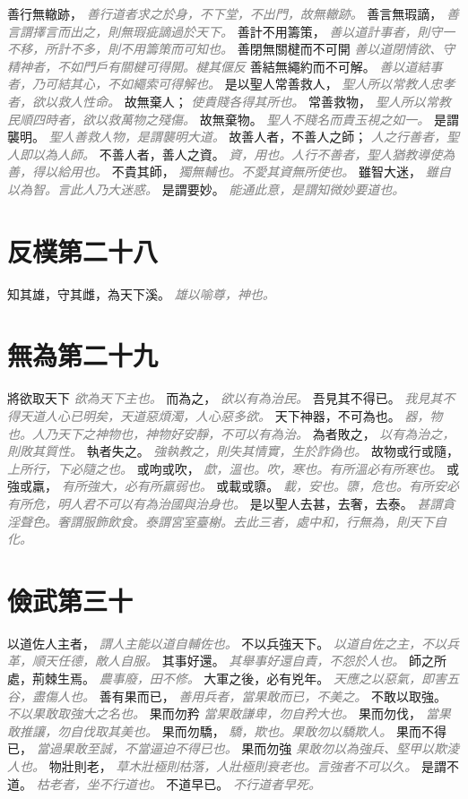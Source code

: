 \documentclass[a4paper,zihao=-4,oneside,landscape,UTF8]{ctexart}
\newcommand{\zhushi}[1]{\scriptsize{\textit{\textcolor{gray}{#1}}}\normalsize}
\begin{document}
善行無轍跡，
\zhushi{善行道者求之於身，不下堂，不出門，故無轍跡。}
善言無瑕謫，
\zhushi{善言謂擇言而出之，則無瑕疵謫過於天下。}
善計不用籌策，
\zhushi{善以道計事者，則守一不移，所計不多，則不用籌策而可知也。}
善閉無關楗而不可開
\zhushi{善以道閉情欲、守精神者，不如門戶有關楗可得開。楗其偃反}
善結無繩約而不可解。
\zhushi{善以道結事者，乃可結其心，不如繩索可得解也。}
是以聖人常善救人，
\zhushi{聖人所以常教人忠孝者，欲以救人性命。}
故無棄人；
\zhushi{使貴賤各得其所也。}
常善救物，
\zhushi{聖人所以常教民順四時者，欲以救萬物之殘傷。}
故無棄物。
\zhushi{聖人不賤名而貴玉視之如一。}
是謂襲明。
\zhushi{聖人善救人物，是謂襲明大道。}
故善人者，不善人之師；
\zhushi{人之行善者，聖人即以為人師。}
不善人者，善人之資。
\zhushi{資，用也。人行不善者，聖人猶教導使為善，得以給用也。}
不貴其師，
\zhushi{獨無輔也。不愛其資無所使也。}
雖智大迷，
\zhushi{雖自以為智。言此人乃大迷惑。}
是謂要妙。
\zhushi{能通此意，是謂知微妙要道也。}


\section{反樸第二十八}

知其雄，守其雌，為天下溪。
\zhushi{雄以喻尊，神也。}


\section{無為第二十九}

將欲取天下
\zhushi{欲為天下主也。}
而為之，
\zhushi{欲以有為治民。}
吾見其不得已。
\zhushi{我見其不得天道人心已明矣，天道惡煩濁，人心惡多欲。}
天下神器，不可為也。
\zhushi{器，物也。人乃天下之神物也，神物好安靜，不可以有為治。}
為者敗之，
\zhushi{以有為治之，則敗其質性。}
執者失之。
\zhushi{強執教之，則失其情實，生於詐偽也。}
故物或行或隨，
\zhushi{上所行，下必隨之也。}
或呴或吹，
\zhushi{歔，溫也。吹，寒也。有所溫必有所寒也。}
或強或羸，
\zhushi{有所強大，必有所羸弱也。}
或載或隳。
\zhushi{載，安也。隳，危也。有所安必有所危，明人君不可以有為治國與治身也。}
是以聖人去甚，去奢，去泰。
\zhushi{甚謂貪淫聲色。奢謂服飾飲食。泰謂宮室臺榭。去此三者，處中和，行無為，則天下自化。}


\section{儉武第三十}

以道佐人主者，
\zhushi{謂人主能以道自輔佐也。}
不以兵強天下。
\zhushi{以道自佐之主，不以兵革，順天任德，敵人自服。}
其事好還。
\zhushi{其舉事好還自責，不怨於人也。}
師之所處，荊棘生焉。
\zhushi{農事廢，田不修。}
大軍之後，必有兇年。
\zhushi{天應之以惡氣，即害五谷，盡傷人也。}
善有果而已，
\zhushi{善用兵者，當果敢而已，不美之。}
不敢以取強。
\zhushi{不以果敢取強大之名也。}
果而勿矜
\zhushi{當果敢謙卑，勿自矜大也。}
果而勿伐，
\zhushi{當果敢推讓，勿自伐取其美也。}
果而勿驕，
\zhushi{驕，欺也。果敢勿以驕欺人。}
果而不得已，
\zhushi{當過果敢至誠，不當逼迫不得已也。}
果而勿強
\zhushi{果敢勿以為強兵、堅甲以欺淩人也。}
物壯則老，
\zhushi{草木壯極則枯落，人壯極則衰老也。言強者不可以久。}
是謂不道。
\zhushi{枯老者，坐不行道也。}
不道早已。
\zhushi{不行道者早死。}
\end{document}
